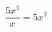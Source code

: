 \documentclass[preview]{standalone}
\begin{document}
\begin{center}
$\dfrac{5x^3}{x}=5x^2$
\end{center}
\end{document}
